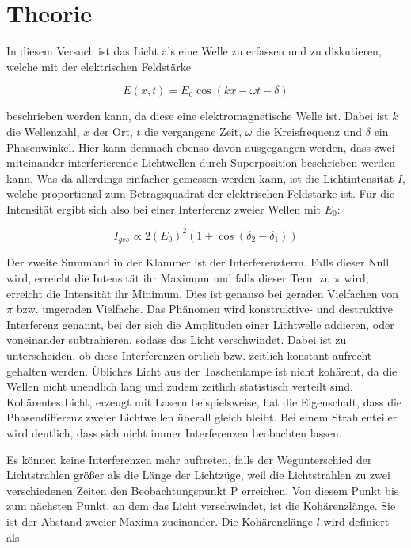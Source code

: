\section{Theorie}
\label{sec:Theorie}

In diesem Versuch ist das Licht als eine Welle zu erfassen und zu diskutieren, welche mit der elektrischen Feldstärke 

\begin{equation}
    E(x,t) = E_0 \cos(kx-\omega t - \delta)
\end{equation}

beschrieben werden kann, da diese eine elektromagnetische Welle ist. Dabei ist \(k\) die Wellenzahl, \(x\) der Ort, \(t\) die vergangene Zeit, \(\omega\) die Kreisfrequenz und \(\delta\) ein Phasenwinkel. Hier kann demnach ebenso davon ausgegangen werden, dass zwei miteinander interferierende Lichtwellen durch Superposition beschrieben werden kann. Was da allerdings einfacher gemessen werden kann, ist die Lichtintensität \(I\), welche proportional zum Betragsquadrat der elektrischen Feldstärke ist. Für die Intensität ergibt sich also bei einer Interferenz zweier Wellen mit \(E_0\):

\begin{equation}
    I_{ges} \propto 2(E_0)^2(1+\cos(\delta_2 - \delta_1))
\end{equation}

Der zweite Summand in der Klammer ist der Interferenzterm. Falls dieser Null wird, erreicht die Intensität ihr Maximum und falls dieser Term zu \(\pi\) wird, erreicht die Intensität ihr Minimum. Dies ist genauso bei geraden Vielfachen von \(\pi\) bzw. ungeraden Vielfache. Das Phänomen wird konstruktive- und destruktive Interferenz genannt, bei der sich die Amplituden einer Lichtwelle addieren, oder voneinander subtrahieren, sodass das Licht verschwindet. Dabei ist zu unterscheiden, ob diese Interferenzen örtlich bzw. zeitlich konstant aufrecht gehalten werden. Übliches Licht aus der Taschenlampe ist nicht kohärent, da die Wellen nicht unendlich lang und zudem zeitlich statistisch verteilt sind. Kohärentes Licht, erzeugt mit Lasern beispielsweise, hat die Eigenschaft, dass die Phasendifferenz zweier Lichtwellen überall gleich bleibt. Bei einem Strahlenteiler wird deutlich, dass sich nicht immer Interferenzen beobachten lassen. 


Es können keine Interferenzen mehr auftreten, falls der Wegunterschied der Lichtstrahlen größer als die Länge der Lichtzüge, weil die Lichtstrahlen zu zwei verschiedenen Zeiten den Beobachtungspunkt P erreichen. Von diesem Punkt bis zum nächsten Punkt, an dem das Licht verschwindet, ist die Kohärenzlänge. Sie ist der Abstand zweier Maxima zueinander. Die Kohärenzlänge \(l\) wird definiert als


